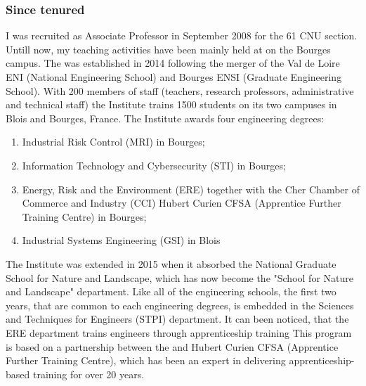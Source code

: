 \subsubsection{Since tenured}
I was recruited as Associate Professor  in September 2008 for the 61 CNU section.
Untill now, my teaching activities have been mainly held at  \INSA \CVL on the Bourges campus.
The \INSA \CVL was established in 2014 following the merger of the Val de Loire ENI (National Engineering School) and Bourges ENSI (Graduate Engineering School).
With 200 members of staff (teachers, research professors, administrative and technical staff) the Institute trains 1500 students on its two campuses in Blois and Bourges, France. 
The Institute awards four engineering degrees:
\begin{enumerate}
  \item Industrial Risk Control (MRI) in Bourges;
  \item Information Technology and Cybersecurity (STI)   in Bourges; 
  \item Energy, Risk and the Environment (ERE) together with the Cher Chamber of Commerce and Industry (CCI) Hubert Curien CFSA (Apprentice Further Training Centre) in Bourges;
  \item Industrial Systems Engineering (GSI) in Blois
\end{enumerate}
The Institute was extended in 2015 when it absorbed the National Graduate School for Nature and Landscape, which has now become the "School for Nature and Landscape" department. 
Like all of the \INSA engineering schools, the first two years, that are common to each engineering degrees, is embedded in the Sciences and Techniques for Engineers (STPI) department.
It can been noticed, that the ERE department trains engineers through apprenticeship training
This program is  based on a partnership between the \INSA \CVL and Hubert Curien CFSA (Apprentice Further Training Centre), which has been an expert in delivering apprenticeship-based training for over 20 years.


\SkipAndBreak[1.5]

